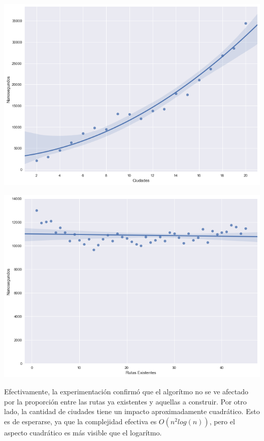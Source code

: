 \begin{center}
	\includegraphics[scale=0.5]{imagenes/ej3-1.png}

	\includegraphics[scale=0.5]{imagenes/ej3-2.png}
\end{center}

Efectivamente, la experimentación confirmó que el algorítmo no se ve afectado por la proporción entre las rutas ya existentes y aquellas a construir. Por otro lado, la cantidad de ciudades tiene un impacto aproximadamente cuadrático. Esto es de esperarse, ya que la complejidad efectiva es $O(n^2log(n))$, pero el aspecto cuadrático es más visible que el logarítmo.
